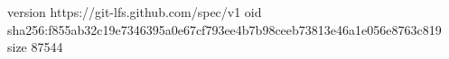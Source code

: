 version https://git-lfs.github.com/spec/v1
oid sha256:f855ab32c19e7346395a0e67cf793ee4b7b98ceeb73813e46a1e056e8763c819
size 87544
